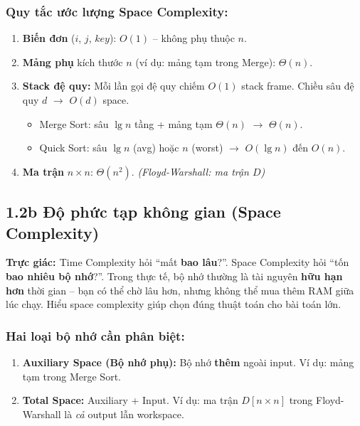 \documentclass[10pt]{article}
\newcommand{\intuition}[1]{%
  \begin{tcolorbox}[colback=blue!5!white, colframe=blue!60!white, leftrule=3pt,
    toprule=0pt, bottomrule=0pt, rightrule=0pt,
    boxsep=2pt, left=6pt, right=6pt, top=4pt, bottom=4pt]
  \small\textbf{\textcolor{blue!80!black}{Trực giác: }}#1
  \end{tcolorbox}}
\providecommand{\tightlist}{\setlength{\itemsep}{0pt}\setlength{\parskip}{0pt}}
\begin{document}
\subsubsection{Quy tắc ước lượng Space Complexity:}

\begin{enumerate}
\item \textbf{Biến đơn} ($i$, $j$, $key$): $O(1)$ -- không phụ thuộc $n$.
\item \textbf{Mảng phụ} kích thước $n$ (ví dụ: mảng tạm trong Merge): $\Theta(n)$.
\item \textbf{Stack đệ quy:} Mỗi lần gọi đệ quy chiếm $O(1)$ stack frame. Chiều sâu đệ quy $d$ $\to$ $O(d)$ space.
\begin{itemize}
\item Merge Sort: sâu $\lg n$ tầng + mảng tạm $\Theta(n)$ $\to$ $\Theta(n)$.
\item Quick Sort: sâu $\lg n$ (avg) hoặc $n$ (worst) $\to$ $O(\lg n)$ đến $O(n)$.
\end{itemize}
\item \textbf{Ma trận} $n \times n$: $\Theta(n^2)$. \textit{(Floyd-Warshall: ma trận $D$)}
\end{enumerate}

\subsection{1.2b Độ phức tạp không gian (Space Complexity)}\label{space-complexity}

\intuition{Time Complexity hỏi ``mất \textbf{bao lâu}?''. Space Complexity hỏi ``tốn \textbf{bao nhiêu bộ nhớ}?''. Trong thực tế, bộ nhớ thường là tài nguyên \textbf{hữu hạn hơn} thời gian -- bạn có thể chờ lâu hơn, nhưng không thể mua thêm RAM giữa lúc chạy. Hiểu space complexity giúp chọn đúng thuật toán cho bài toán lớn.}

\subsubsection{Hai loại bộ nhớ cần phân biệt:}

\begin{enumerate}
\def\labelenumi{\arabic{enumi}.}
\tightlist
\item
  \textbf{Auxiliary Space (Bộ nhớ phụ):} Bộ nhớ \textbf{thêm} ngoài input. Ví dụ: mảng tạm trong Merge Sort.
\item
  \textbf{Total Space:} Auxiliary + Input. Ví dụ: ma trận $D[n \times n]$ trong Floyd-Warshall là \textit{cả} output lẫn workspace.
\end{enumerate}
\end{document}
